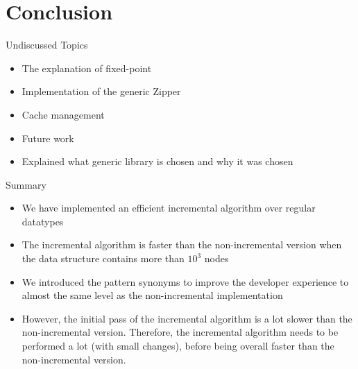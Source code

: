 \section{Conclusion}

\begin{slide}{Undiscussed Topics}
\begin{itemize}
  \setlength\itemsep{.7em}
  \item The explanation of fixed-point
  \item Implementation of the generic Zipper
  \item Cache management
  \item Future work
  \item Explained what generic library is chosen and why it was chosen
\end{itemize}
\end{slide}

\begin{slide}{Summary}
\begin{itemize}
  \setlength\itemsep{1em}
  \item We have implemented an efficient incremental algorithm over regular datatypes
  \item The incremental algorithm is faster than the non-incremental version when the data structure contains more than $10^3$ nodes
  \item We introduced the pattern synonyms to improve the developer experience to almost the same
  level as the non-incremental implementation
  \item However, the initial pass of the incremental algorithm is a lot slower than the non-incremental version. Therefore, the incremental algorithm needs to be performed a lot (with small changes), before being overall faster than the non-incremental version.
\end{itemize}
\end{slide}